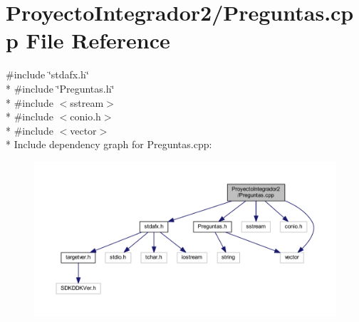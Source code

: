 \section{Proyecto\-Integrador2/\-Preguntas.cpp File Reference}
\label{_preguntas_8cpp}
{\ttfamily \#include \char`\"{}stdafx.\-h\char`\"{}}\\*
{\ttfamily \#include \char`\"{}Preguntas.\-h\char`\"{}}\\*
{\ttfamily \#include $<$sstream$>$}\\*
{\ttfamily \#include $<$conio.\-h$>$}\\*
{\ttfamily \#include $<$vector$>$}\\*
Include dependency graph for Preguntas.\-cpp\-:\nopagebreak
\begin{figure}[H]
\begin{center}
\leavevmode
\includegraphics[width=350pt]{_preguntas_8cpp__incl}
\end{center}
\end{figure}
